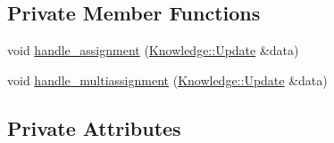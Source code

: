 \subsection*{Private Member Functions}
\begin{DoxyCompactItemize}
\item 
void \hyperlink{classMadara_1_1Transport_1_1Splice__Read__Thread_aed89155ab54fc86e90a71a138350b1f8}{handle\_\-assignment} (\hyperlink{structKnowledge_1_1Update}{Knowledge::Update} \&data)
\item 
void \hyperlink{classMadara_1_1Transport_1_1Splice__Read__Thread_a2ff87127681cab58e6313efd0d2965a3}{handle\_\-multiassignment} (\hyperlink{structKnowledge_1_1Update}{Knowledge::Update} \&data)
\end{DoxyCompactItemize}
\subsection*{Private Attributes}
